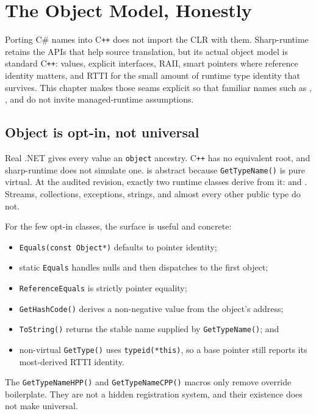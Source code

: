 \chapter{The Object Model, Honestly}
\label{ch:sharp-object-model}

Porting C\# names into C\texttt{++} does not import the CLR with them. Sharp-runtime retains
the APIs that help source translation, but its actual object model is standard C\texttt{++}:
values, explicit interfaces, RAII, smart pointers where reference identity matters, and RTTI
for the small amount of runtime type identity that survives. This chapter makes those seams
explicit so that familiar names such as , , and
 do not invite managed-runtime assumptions.

\section{Object is opt-in, not universal}

Real .NET gives every value an \texttt{object} ancestry. C\texttt{++} has no equivalent root,
and sharp-runtime does not simulate one.  is abstract because
\texttt{GetTypeName()} is pure virtual. At the audited revision, exactly two runtime classes
derive from it:  and . Streams, collections,
exceptions, strings, and almost every other public type do not.

For the few opt-in classes, the surface is useful and concrete:

\begin{itemize}
  \item \texttt{Equals(const Object*)} defaults to pointer identity;
  \item static \texttt{Equals} handles nulls and then dispatches to the first object;
  \item \texttt{ReferenceEquals} is strictly pointer equality;
  \item \texttt{GetHashCode()} derives a non-negative value from the object's address;
  \item \texttt{ToString()} returns the stable name supplied by \texttt{GetTypeName()}; and
  \item non-virtual \texttt{GetType()} uses \texttt{typeid(*this)}, so a base pointer still
        reports its most-derived RTTI identity.
\end{itemize}

The \texttt{GetTypeNameHPP()} and \texttt{GetTypeNameCPP()} macros only remove override
boilerplate. They are not a hidden registration system, and their existence does not make
 universal.

